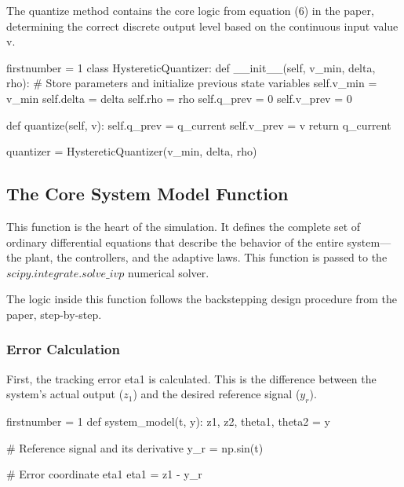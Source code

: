 The quantize method contains the core logic from equation (6) in the paper, determining the correct discrete output level based on the continuous input value v.

\begin{code}
	\begin{matlabcode}{firstnumber = 1}
class HystereticQuantizer:
def __init__(self, v_min, delta, rho):
# Store parameters and initialize previous state variables
self.v_min = v_min
self.delta = delta
self.rho = rho
self.q_prev = 0
self.v_prev = 0

def quantize(self, v):
self.q_prev = q_current
self.v_prev = v
return q_current

quantizer = HystereticQuantizer(v_min, delta, rho)
	\end{matlabcode}
	\label{code:p32}
\end{code}

\subsection{The Core System Model Function}
This function is the heart of the simulation. It defines the complete set of ordinary differential equations that describe the behavior of the entire system—the plant, the controllers, and the adaptive laws. This function is passed to the $scipy.integrate.solve\_ivp$ numerical solver.

The logic inside this function follows the backstepping design procedure from the paper, step-by-step.

\subsubsection{Error Calculation}
First, the tracking error eta1 is calculated. This is the difference between the system's actual output ($z_1$) and the desired reference signal ($y_r$).
\begin{code}
	\begin{matlabcode}{firstnumber = 1}
def system_model(t, y):
z1, z2, theta1, theta2 = y

# Reference signal and its derivative
y_r = np.sin(t)

# Error coordinate eta1
eta1 = z1 - y_r
	\end{matlabcode}
	\label{code:p33}
\end{code}
